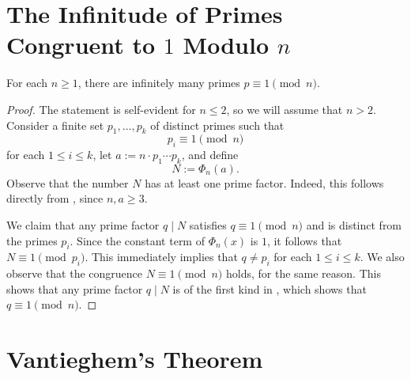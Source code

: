 \section{The Infinitude of Primes Congruent to \texorpdfstring{$1$}{1} Modulo \texorpdfstring{$n$}{n}}

\begin{theorem}
  For each $n\geq 1$, there are infinitely many primes $p\equiv 1\pmod{n}$. 
\end{theorem}

\begin{proof}
  The statement is self-evident for $n\leq 2$, so we will assume that $n>2$. Consider a finite set $p_1,\ldots,p_k$ of distinct primes such that
  \begin{equation*}
    p_i\equiv 1\pmod{n}
  \end{equation*}
  for each $1\leq i\leq k$, let $a:=n\cdot p_1\cdots p_k$, and define
  \begin{equation*}
    N:=\Phi_n(a).
  \end{equation*}
  Observe that the number $N$ has at least one prime factor. Indeed, this follows directly from , since $n,a\geq 3$.

We claim that any prime factor $q\mid N$ satisfies $q\equiv 1\pmod{n}$ and is distinct from the primes $p_i$. Since the constant term of $\Phi_n(x)$ is $1$, it follows that $N\equiv 1\pmod{p_i}$. This immediately implies that $q\neq p_i$ for each $1\leq i\leq k$. We also observe that the congruence $N\equiv 1\pmod{n}$ holds, for the same reason. This shows that any prime factor $q\mid N$ is of the first kind in , which shows that $q\equiv 1\pmod{n}$.
\end{proof}

\section{Vantieghem's Theorem}

